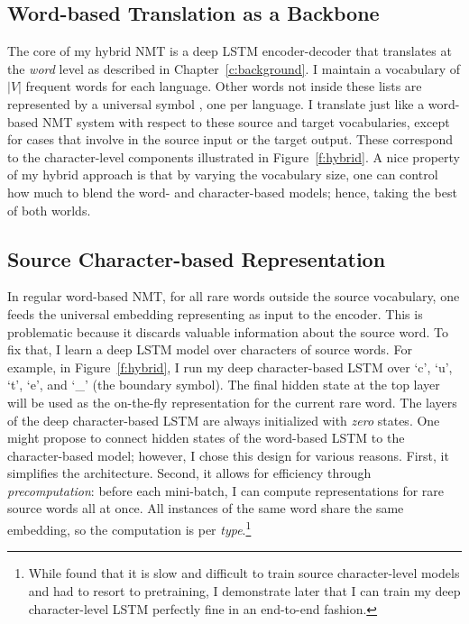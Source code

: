 \subsection{Word-based Translation as a Backbone}
\label{subsec:hybrid_word}
The core of my hybrid NMT is a deep LSTM encoder-decoder that translates at
the {\it word} level as described in Chapter~\ref{c:background}. I maintain a
vocabulary of $|V|$ frequent words for each language. Other words not inside these
lists are represented by a universal symbol \unk{}, one per language.
I translate just like a word-based NMT system with respect to these source and
target vocabularies, except for cases that involve \unk{} in the source input or 
the target output. These correspond to the character-level components 
illustrated in Figure~\ref{f:hybrid}.
A nice property of my hybrid approach is that by varying the vocabulary size,
 one can control how much to blend the
word- and character-based models; hence, taking the best of both
worlds. 


\subsection{Source Character-based Representation}
\label{subsec:src}
In regular word-based
NMT, for all rare words outside the source vocabulary, one feeds the
universal embedding representing \unk{} as input to the encoder. This is
problematic because it discards valuable information about the source word. To
fix that, I learn a deep LSTM model over characters
of source words. 
For example, in Figure~\ref{f:hybrid}, I run
my deep character-based LSTM over `c', `u', `t', `e', and `\_' (the boundary
symbol). The final hidden state at the top layer will be used as the on-the-fly
representation for the current rare word.
The layers of the deep character-based LSTM are always initialized with {\it
zero} states. One might propose to connect hidden
states of the word-based LSTM to the character-based model; however, I chose this design
for various reasons. First, it simplifies the architecture. Second, it allows
for efficiency through {\it precomputation}: before each mini-batch, I can compute
representations for rare source words all at once. All instances of the same
word share the same embedding, so the computation is per {\it type}.\footnote{While  found that it is slow and difficult to train
source character-level models and had to resort to pretraining, I demonstrate
later that I can train my deep character-level LSTM
perfectly fine in an end-to-end fashion.} 

